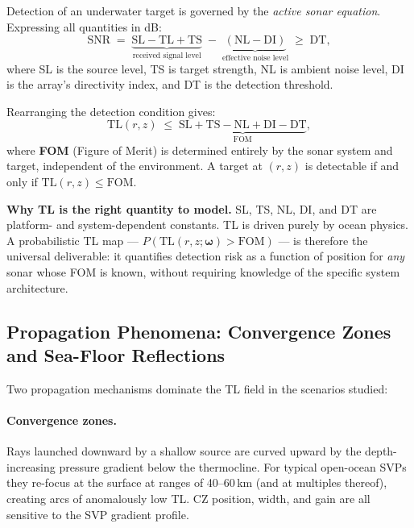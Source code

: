 \documentclass[11pt,a4paper]{article}
\begin{document}
Detection of an underwater target is governed by the \emph{active sonar
equation}.
Expressing all quantities in dB:
\begin{equation}
  \mathrm{SNR}
  \;=\;
  \underbrace{\mathrm{SL} - \mathrm{TL} + \mathrm{TS}}_{\text{received signal level}}
  \;-\;
  \underbrace{(\mathrm{NL} - \mathrm{DI})}_{\text{effective noise level}}
  \;\geq\; \mathrm{DT},
  \label{eq:sonar_eq}
\end{equation}
where SL is the source level, TS is target strength, NL is ambient noise
level, DI is the array's directivity index, and DT is the detection threshold.

Rearranging the detection condition gives:
\begin{equation}
  \mathrm{TL}(r,z) \;\leq\;
  \underbrace{\mathrm{SL} + \mathrm{TS} - \mathrm{NL} + \mathrm{DI} - \mathrm{DT}}_{\displaystyle\mathrm{FOM}},
  \label{eq:fom}
\end{equation}
where \textbf{FOM} (Figure of Merit) is determined entirely by the sonar
system and target, independent of the environment.
A target at $(r,z)$ is detectable if and only if $\mathrm{TL}(r,z) \leq \mathrm{FOM}$.

\medskip
\noindent\textbf{Why TL is the right quantity to model.}
SL, TS, NL, DI, and DT are platform- and system-dependent constants.
TL is driven purely by ocean physics.
A probabilistic TL map --- $P(\mathrm{TL}(r,z;\boldsymbol\omega) > \mathrm{FOM})$
--- is therefore the universal deliverable: it quantifies detection risk as a
function of position for \emph{any} sonar whose FOM is known, without requiring
knowledge of the specific system architecture.

\subsection{Propagation Phenomena: Convergence Zones and Sea-Floor Reflections}
\label{sec:propagation_phenomena}

Two propagation mechanisms dominate the TL field in the scenarios studied:

\paragraph{Convergence zones.}
Rays launched downward by a shallow source are curved upward by the
depth-increasing pressure gradient below the thermocline.
For typical open-ocean SVPs they re-focus at the surface at ranges of
40--60\,km (and at multiples thereof), creating arcs of anomalously low TL.
CZ position, width, and gain are all sensitive to the SVP gradient profile.
\end{document}
